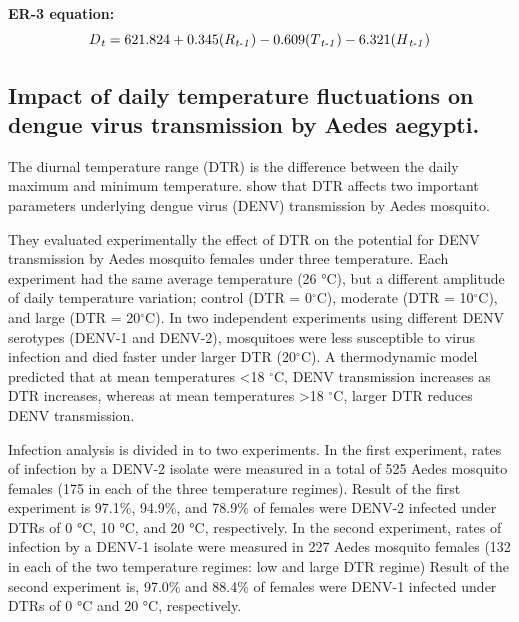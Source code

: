 \documentclass[review]{elsarticle}
\begin{document}
\textbf{ER-3 equation:} 
\begin{equation}
\label{eq:er-3}
D\textsubscript{\textit{t}} =   621.824 + 0.345(R\textsubscript{\textit{t-1}}) - 0.609(T\textsubscript{\textit{t-1}}) - 6.321(H\textsubscript{\textit{t-1}} )
\end{equation}


\subsection{Impact of daily temperature fluctuations on dengue virus transmission by Aedes aegypti.}

The diurnal temperature range (DTR) is the difference between the daily maximum and minimum temperature. \cite{lambrechts2011impact} show that DTR affects two important parameters underlying dengue virus (DENV) transmission by Aedes mosquito.

They evaluated experimentally the effect of DTR on the potential for DENV transmission by Aedes mosquito females under three temperature. Each experiment had the same average temperature (26 °C), but a different amplitude of daily temperature variation; control (DTR = 0$^{\circ}$C), moderate (DTR = 10$^{\circ}$C), and large (DTR = 20$^{\circ}$C). In two independent experiments using different DENV serotypes (DENV-1 and DENV-2), mosquitoes were less susceptible to virus infection and died faster under larger DTR (20$^{\circ}$C).  A thermodynamic model predicted that at mean temperatures <18 $^{\circ}$C, DENV transmission increases as DTR increases, whereas at mean temperatures >18 $^{\circ}$C, larger DTR reduces DENV transmission.

Infection analysis is divided in to two experiments. In the first experiment, rates of infection by a DENV-2 isolate were measured in a total of 525 Aedes mosquito females (175 in each of the three temperature regimes). Result of the first experiment is 97.1\%, 94.9\%, and 78.9\% of females were DENV-2 infected under DTRs of 0 °C, 10 °C, and 20 °C, respectively. In the second experiment, rates of infection by a DENV-1 isolate were measured in 227 Aedes mosquito females (132 in each of the two temperature regimes: low and large DTR regime) Result of the second experiment is, 97.0\% and 88.4\% of females were DENV-1 infected under DTRs of 0 °C and 20 °C, respectively.
\end{document}
